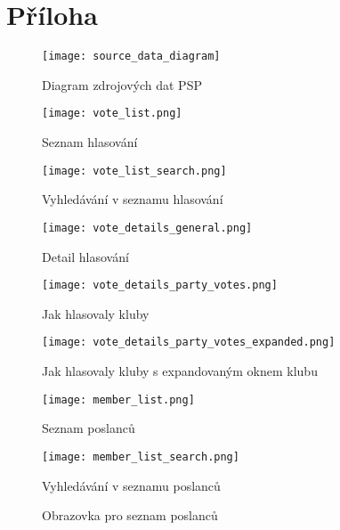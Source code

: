 \chapter{Příloha}

\begin{figure}[H]
	\texttt{[image: source\_data\_diagram]}
	\caption{Diagram zdrojových dat PSP}
	\label{fig:class-diagram}
\end{figure}

\begin{figure}[H]
	\begin{minipage}{0.5\textwidth}
		\centering
		\texttt{[image: vote\_list.png]}
		\caption{Seznam hlasování}
		\label{fig:vote_list}
	\end{minipage}%
	\begin{minipage}{0.5\textwidth}
		\centering
		\texttt{[image: vote\_list\_search.png]}
		\caption{Vyhledávání v seznamu hlasování}
		\label{fig:vote_list_search}
	\end{minipage}
\end{figure}

\begin{figure}[H]
	\begin{minipage}{0.5\textwidth}
		\centering
		\texttt{[image: vote\_details\_general.png]}
		\caption{Detail hlasování}
		\label{fig:vote_details_general}
	\end{minipage}%
	\begin{minipage}{0.5\textwidth}
		\centering
		\texttt{[image: vote\_details\_party\_votes.png]}
		\caption{Jak hlasovaly kluby}
		\label{fig:vote_details_party_votes}
	\end{minipage}
	\begin{minipage}{0.5\textwidth}
	\centering
	\texttt{[image: vote\_details\_party\_votes\_expanded.png]}
	\caption{Jak hlasovaly kluby s expandovaným oknem klubu}
	\label{fig:vote_details_party_votes_expanded}
\end{minipage}
\end{figure}

\begin{figure}[H]
	\begin{minipage}{0.5\textwidth}
		\centering
		\texttt{[image: member\_list.png]}
		\caption{Seznam poslanců}
		\label{fig:member_list}
	\end{minipage}%
	\begin{minipage}{0.5\textwidth}
		\centering
		\texttt{[image: member\_list\_search.png]}
		\caption{Vyhledávání v seznamu poslanců}
		\label{fig:member_list_search}
	\end{minipage}
	\caption{Obrazovka pro seznam poslanců}
\end{figure}

